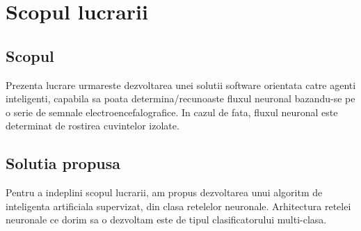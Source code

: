\section{Scopul lucrarii}

\subsection{Scopul}

\quad Prezenta lucrare urmareste dezvoltarea unei solutii software
orientata catre agenti inteligenti, capabila sa poata
determina/recunoaste fluxul neuronal bazandu-se pe o serie de 
semnale electroencefalografice. In cazul de fata, fluxul neuronal este
determinat de rostirea cuvintelor izolate.

\subsection{Solutia propusa}

\quad Pentru a indeplini scopul lucrarii, am propus dezvoltarea unui algoritm de inteligenta
artificiala supervizat, din clasa retelelor neuronale. Arhitectura retelei neuronale ce 
dorim sa o dezvoltam este de tipul clasificatorului multi-clasa.


